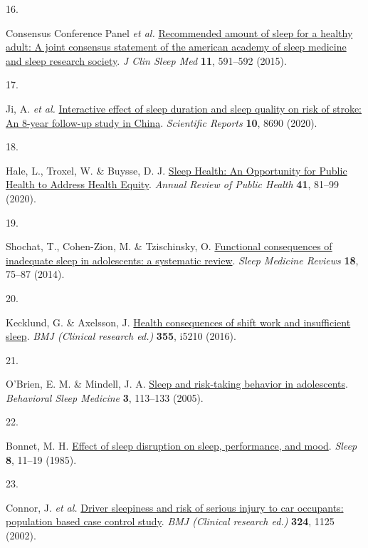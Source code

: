 \documentclass[
  10pt,
]{scrbook}
\newlength{\cslhangindent}
\newlength{\csllabelwidth}
\newlength{\cslentryspacingunit} %
\newenvironment{CSLReferences}[2] %
 {%
  \setlength{\parindent}{0pt}
  \ifodd #1
  \let\oldpar\par
  \def\par{\hangindent=\cslhangindent\oldpar}
  \fi
  \setlength{\parskip}{#2\cslentryspacingunit}
 }%
 {}
\newcommand{\CSLLeftMargin}[1]{\parbox[t]{\csllabelwidth}{#1}}
\newcommand{\CSLRightInline}[1]{\parbox[t]{\linewidth - \csllabelwidth}{#1}\break}
\let\originaltextbf\textbf
\renewcommand{\textbf}[1]{\textcolor{color1}{\textsf{\originaltextbf{#1}}}}
\begin{document}
\begin{CSLReferences}{0}{0}
\leavevmode{}%
\CSLLeftMargin{16. }%
\CSLRightInline{Consensus Conference Panel \emph{et al.}
\href{https://doi.org/10.5664/jcsm.4758}{Recommended amount of sleep for
a healthy adult: A joint consensus statement of the american academy of
sleep medicine and sleep research society}. \emph{J Clin Sleep Med}
\textbf{11}, 591--592 (2015).}

\leavevmode{}%
\CSLLeftMargin{17. }%
\CSLRightInline{Ji, A. \emph{et al.}
\href{https://doi.org/10.1038/s41598-020-65611-y}{Interactive effect of
sleep duration and sleep quality on risk of stroke: An 8-year follow-up
study in China}. \emph{Scientific Reports} \textbf{10}, 8690 (2020).}

\leavevmode{}%
\CSLLeftMargin{18. }%
\CSLRightInline{Hale, L., Troxel, W. \& Buysse, D. J.
\href{https://doi.org/10.1146/annurev-publhealth-040119-094412}{Sleep
Health: An Opportunity for Public Health to Address Health Equity}.
\emph{Annual Review of Public Health} \textbf{41}, 81--99 (2020).}

\leavevmode{}%
\CSLLeftMargin{19. }%
\CSLRightInline{Shochat, T., Cohen-Zion, M. \& Tzischinsky, O.
\href{https://doi.org/10.1016/j.smrv.2013.03.005}{Functional
consequences of inadequate sleep in adolescents: a systematic review}.
\emph{Sleep Medicine Reviews} \textbf{18}, 75--87 (2014).}

\leavevmode{}%
\CSLLeftMargin{20. }%
\CSLRightInline{Kecklund, G. \& Axelsson, J.
\href{https://doi.org/10.1136/bmj.i5210}{Health consequences of shift
work and insufficient sleep}. \emph{BMJ (Clinical research ed.)}
\textbf{355}, i5210 (2016).}

\leavevmode{}%
\CSLLeftMargin{21. }%
\CSLRightInline{O'Brien, E. M. \& Mindell, J. A.
\href{https://doi.org/10.1207/s15402010bsm0303_1}{Sleep and risk-taking
behavior in adolescents}. \emph{Behavioral Sleep Medicine} \textbf{3},
113--133 (2005).}

\leavevmode{}%
\CSLLeftMargin{22. }%
\CSLRightInline{Bonnet, M. H.
\href{https://doi.org/10.1093/sleep/8.1.11}{Effect of sleep disruption
on sleep, performance, and mood}. \emph{Sleep} \textbf{8}, 11--19
(1985).}

\leavevmode{}%
\CSLLeftMargin{23. }%
\CSLRightInline{Connor, J. \emph{et al.}
\href{https://doi.org/10.1136/bmj.324.7346.1125}{Driver sleepiness and
risk of serious injury to car occupants: population based case control
study}. \emph{BMJ (Clinical research ed.)} \textbf{324}, 1125 (2002).}


\end{CSLReferences}
\end{document}
